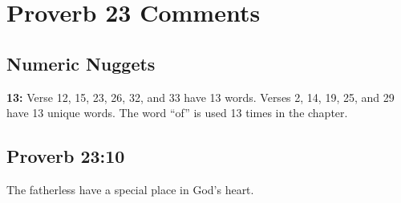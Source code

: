 \section{Proverb 23 Comments}

\subsection{Numeric Nuggets}
\textbf{13:} Verse 12, 15, 23, 26, 32, and 33 have 13 words. Verses 2, 14, 19, 25, and 29 have 13 unique words. The word ``of'' is used 13 times in the chapter.


\subsection{Proverb 23:10}
The fatherless have a special place in God's heart.